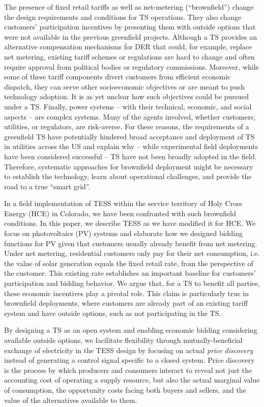 \documentclass[12pt]{article}{Definitions/mdpi}
\begin{document}
The presence of fixed retail tariffs as well as net-metering (``brownfield'') change the design requirements and conditions for TS operations. They also change customers' participation incentives by presenting them with outside options that were not available in the previous greenfield projects. 
Although a TS provides an alternative compensation mechanisms for DER that could, for example, replace net metering, existing tariff schemes or regulations are hard to change and often require approval from political bodies or regulatory commissions. 
Moreover, while some of these tariff components divert customers from efficient economic dispatch, they can serve other socioeconomic objectives or are meant to push technology adoption. It is as yet unclear how such objectives could be pursued under a TS.
Finally, power systems -- with their technical, economic, and social aspects -- are complex systems. Many of the agents involved, whether customers, utilities, or regulators, are risk-averse. 
For these reasons, the requirements of a greenfield TS have potentially hindered broad acceptance and deployment of TS in utilities across the US and explain why -- while experimental field deployments have been considered successful -- TS have not been broadly adopted in the field.
Therefore, systematic approaches for brownfield deployment might be necessary to establish the technology, learn about operational challenges, and provide the road to a true ``smart grid''.



In a field implementation of TESS within the service territory of Holy Cross Energy (HCE) in Colorado, we have been confronted with such brownfield conditions.
In this paper, we describe TESS as we have modified it for HCE. We focus on photovoltaics (PV) systems and elaborate how we designed bidding functions for PV given that customers usually already benefit from net metering. Under net metering, residential customers only pay for their net consumption, i.e. the value of solar generation equals the fixed retail rate, from the perspective of the customer.
This existing rate establishes an important baseline for customers' participation and bidding behavior.
We argue that, for a TS to benefit all parties, these economic incentives play a pivotal role. This claim is particularly true in brownfield deployments, where customers are already part of an existing tariff system and have outside options, such as not participating in the TS.

By designing a TS as an open system and enabling economic bidding considering available outside options, we facilitate flexibility through mutually-beneficial exchange of electricity in the TESS design by focusing on actual \emph{price discovery} instead of generating a control signal specific to a closed system. Price discovery is the process by which producers and consumers interact to reveal not just the accounting cost of operating a supply resource, but also the actual marginal value of consumption, the opportunity costs facing both buyers and sellers, and the value of the alternatives available to them.  
\end{document}
